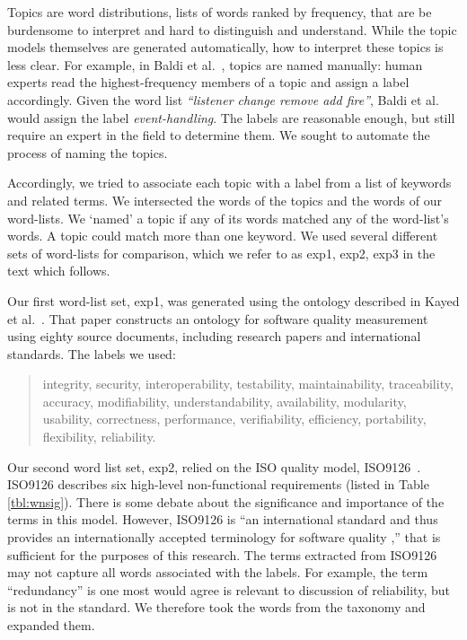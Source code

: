 \documentclass[]{sig-alternate}
\begin{document}
Topics are word distributions, lists of words ranked by frequency, that are be burdensome to interpret and hard to distinguish and understand. 
While the topic models themselves are generated automatically, how to interpret these topics is less clear.
For example,
in Baldi et al.~\cite{Baldi2008}, topics are named manually: human experts read the highest-frequency members of a topic and assign a label accordingly. 
Given the word list \emph{``listener change remove add fire''}, Baldi et al. would assign the label \emph{event-handling}. 
The labels are reasonable enough, but still require an expert in the field to determine them. 
We sought to automate the process of naming the topics.

Accordingly, we tried to associate each topic with a label from a list of keywords and related terms. 
We intersected the words of the topics and the words of our word-lists.
We `named' a topic if any of its words matched any of the word-list's words.
A topic could match more than one keyword.
We used several different sets of word-lists for comparison, which we refer to as \textsf{exp1, exp2, exp3} in the text which follows. 

Our first word-list set, \textsf{exp1}, was generated using the ontology described in Kayed et al.~\cite{5072519}. 
That paper constructs an ontology for software quality measurement using eighty source documents, including research papers and international standards. 
The labels we used:
\begin{quotation}
\small \noindent \textsf{
integrity, security,
interoperability, testability, maintainability, traceability,
accuracy, modifiability, understandability, availability, modularity,
usability, correctness, performance, verifiability, efficiency,
portability, flexibility, reliability.
}
\end{quotation}

Our second word list set, \textsf{exp2}, relied on the ISO quality model, ISO9126~\cite{iso9126}. 
ISO9126 describes six high-level non-functional requirements (listed in Table \ref{tbl:wnsig}). 
There is some debate about the significance and importance of the terms in this model. 
However, ISO9126 is ``an international standard and thus provides an internationally accepted terminology for software quality \cite[p. 58]{Boegh2008},'' that is sufficient for the purposes of this research. 
The terms extracted from ISO9126 may not capture all words associated with the labels.  
For example, the term ``redundancy'' is one most would agree is relevant to discussion of reliability, but is not in the standard. 
We therefore took the words from the taxonomy and expanded them.
\end{document}
